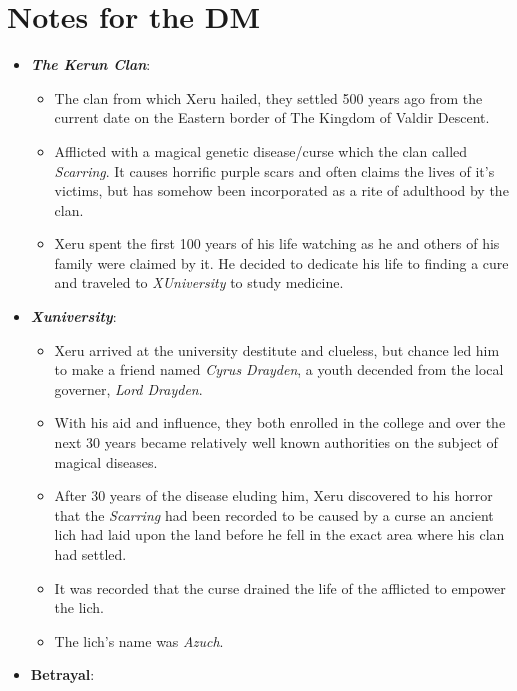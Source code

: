 \documentclass[12pt]{article}
\begin{document}
  \section{Notes for the DM}
  \begin{itemize}
    \item \textbf{\textit{The Kerun Clan}}:
      \begin{itemize}
        \item The clan from which Xeru hailed, they settled 500 years ago from
          the current date on the Eastern border of The Kingdom of Valdir
          Descent.
        \item Afflicted with a magical genetic disease/curse which the clan
          called \textit{Scarring}. It causes horrific purple scars and often
          claims the lives of it's victims, but has somehow been incorporated as
          a rite of adulthood by the clan.
        \item Xeru spent the first 100 years of his life watching as he and
          others of his family were claimed by it. He decided to dedicate his
          life to finding a cure and traveled to \textit{XUniversity} to study
          medicine.
      \end{itemize}
    \item \textbf{\textit{Xuniversity}}: 
      \begin{itemize}
        \item Xeru arrived at the university destitute and clueless, but chance led
          him to make a friend named \textit{Cyrus Drayden}, a youth decended from
          the local governer, \textit{Lord Drayden}.
        \item With his aid and influence, they both enrolled in the college and
          over the next 30 years became relatively well known authorities on the
          subject of magical diseases.
        \item After 30 years of the disease eluding him, Xeru discovered to his
          horror that the \textit{Scarring} had been recorded to be caused by
          a curse an ancient lich had laid upon the land before he fell in the
          exact area where his clan had settled.
        \item It was recorded that the curse drained the life of the afflicted
          to empower the lich.
        \item The lich's name was \textit{Azuch}.
      \end{itemize}
    \item \textbf{Betrayal}:

\end{itemize}
\end{document}
